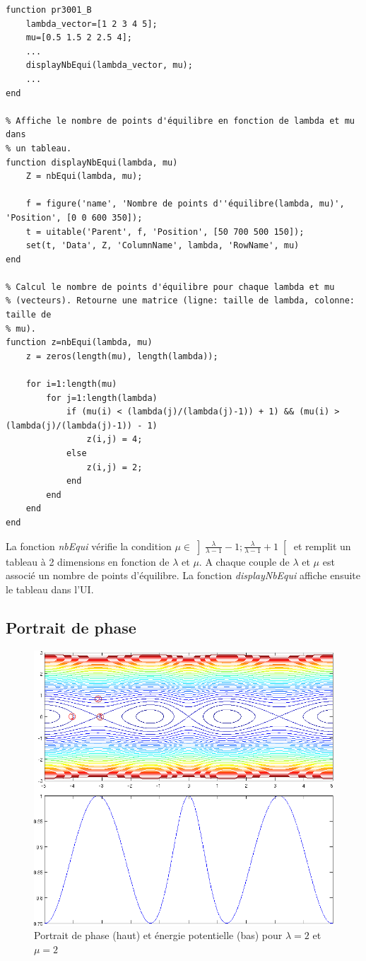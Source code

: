 \documentclass[11pt]{article}
\begin{document}
\begin{lstlisting}
function pr3001_B
	lambda_vector=[1 2 3 4 5];
	mu=[0.5 1.5 2 2.5 4];
	...
	displayNbEqui(lambda_vector, mu);
	...
end

% Affiche le nombre de points d'équilibre en fonction de lambda et mu dans
% un tableau.
function displayNbEqui(lambda, mu)
    Z = nbEqui(lambda, mu);

    f = figure('name', 'Nombre de points d''équilibre(lambda, mu)', 'Position', [0 0 600 350]);
    t = uitable('Parent', f, 'Position', [50 700 500 150]);
    set(t, 'Data', Z, 'ColumnName', lambda, 'RowName', mu)
end

% Calcul le nombre de points d'équilibre pour chaque lambda et mu
% (vecteurs). Retourne une matrice (ligne: taille de lambda, colonne: taille de
% mu).
function z=nbEqui(lambda, mu)
    z = zeros(length(mu), length(lambda));

    for i=1:length(mu)
        for j=1:length(lambda)
            if (mu(i) < (lambda(j)/(lambda(j)-1)) + 1) && (mu(i) > (lambda(j)/(lambda(j)-1)) - 1)
                z(i,j) = 4;
            else
                z(i,j) = 2;
            end
        end
    end
end
\end{lstlisting}
La fonction \emph{nbEqui} vérifie la condition $\displaystyle \mu \in \left] \frac{\lambda}{\lambda - 1}-1 ; \frac{\lambda}{\lambda - 1}+1 \right[$ et remplit un tableau à 2 dimensions en fonction de $\lambda$ et $\mu$. A chaque couple de $\lambda$ et $\mu$ est associé un nombre de points d'équilibre. La fonction \emph{displayNbEqui} affiche ensuite le tableau dans l'UI.

\newpage
\subsection{Portrait de phase}
\begin{figure}[h!]
	\centering
	\includegraphics[scale=0.55]{Figures/rapport_figportraitphasemu2.png}
	\caption{Portrait de phase (haut) et énergie potentielle (bas) pour $\lambda=2$ et $\mu=2$}
	\label{fig:pp_ep_mu2}
\end{figure}
\end{document}
